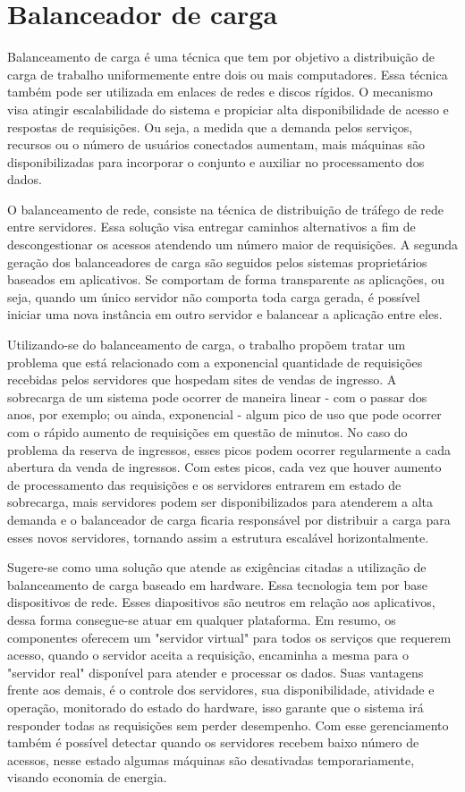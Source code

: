 \chapter{Balanceador de carga}

Balanceamento de carga é uma técnica que tem por objetivo a distribuição de carga de trabalho uniformemente entre dois ou
mais computadores. Essa técnica também pode ser utilizada em enlaces de redes e discos rígidos. O mecanismo visa atingir
escalabilidade do sistema e propiciar alta disponibilidade de acesso e respostas de requisições. Ou seja, a medida que a
demanda pelos serviços, recursos ou o número de usuários conectados aumentam, mais máquinas são disponibilizadas para incorporar
o conjunto e auxiliar no processamento dos dados.


O balanceamento de rede, consiste na técnica de distribuição de tráfego de rede entre servidores. Essa solução visa entregar
caminhos alternativos a fim de descongestionar os acessos atendendo um número maior de requisições. A segunda geração dos
balanceadores de carga são seguidos pelos sistemas proprietários baseados em aplicativos. Se comportam de forma transparente
as aplicações, ou seja, quando um único servidor não comporta toda carga gerada, é possível iniciar uma nova instância em
outro servidor e balancear a aplicação entre eles.


Utilizando-se do balanceamento de carga, o trabalho propõem tratar um problema que está relacionado com a exponencial
quantidade de requisições recebidas pelos servidores que hospedam sites de vendas de ingresso. A sobrecarga de um
sistema pode ocorrer de maneira linear - com o passar dos anos, por exemplo; ou ainda, exponencial - algum pico de uso
que pode ocorrer com o rápido aumento de requisições em questão de minutos.
No caso do problema da reserva de ingressos, esses picos podem ocorrer regularmente a cada abertura da venda de ingressos.
Com estes picos, cada vez que houver aumento de processamento das requisições e os servidores entrarem em
estado de sobrecarga, mais servidores podem ser disponibilizados para atenderem a alta demanda e o balanceador de carga
ficaria responsável por distribuir a carga para esses novos servidores, tornando assim a estrutura escalável
horizontalmente.

Sugere-se como uma solução que atende as exigências citadas a utilização de balanceamento de carga baseado em hardware.
Essa tecnologia tem por base dispositivos de rede. Esses diapositivos são neutros em relação aos aplicativos, dessa forma
consegue-se atuar em qualquer plataforma. Em resumo, os componentes oferecem um "servidor virtual" para todos os serviços
que requerem acesso, quando o servidor aceita a requisição, encaminha a mesma para o "servidor real" disponível para atender
e processar os dados. Suas vantagens frente aos demais, é o controle dos servidores, sua disponibilidade, atividade e
operação, monitorado do estado do hardware, isso garante que o sistema irá responder todas as requisições sem perder
desempenho. Com esse gerenciamento também é possível detectar quando os servidores recebem baixo número de acessos, nesse
estado algumas máquinas são desativadas temporariamente, visando economia de energia.
